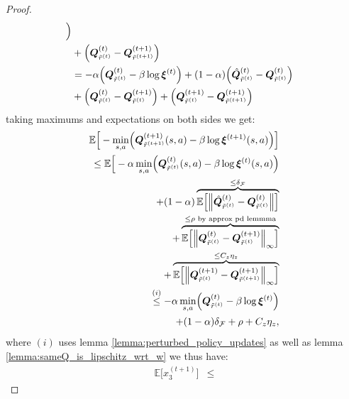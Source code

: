 \begin{proof}
\begin{align*}
    \Bigr) \\ & 
    + \Bigl(
        \bm{Q}^{(t)}_{\tilde{r}^{(t)}}   
        - \bm{Q}_{\tilde{r}^{(t+1)}}^{(t+1)}
    \Bigr)
    \\ 
    &= 
    - \alpha \Bigl(\bm{Q}^{(t)}_{\tilde{r}^{(t)}} - \beta \log \bm{\xi}^{(t)}  \Bigr)
    + (1-\alpha) \Bigl( 
        \hat{\bm{Q}}_{\tilde{r}^{(t)}}^{(t)} 
        - \bm{Q}^{(t)}_{\tilde{r}^{(t)}} 
    \Bigr) \\ & 
    + \Bigl(
        \bm{Q}^{(t)}_{\tilde{r}^{(t)}}   
        - \bm{Q}_{\tilde{r}^{(t)}}^{(t+1)}
        \Bigr)
    + \Bigl(
        \bm{Q}_{\tilde{r}^{(t)}}^{(t+1)}
        - \bm{Q}_{\tilde{r}^{(t+1)}}^{(t+1)}
    \Bigr)
    \\ 
\end{align*}
taking maximums and expectations on both sides we get:
\begin{align*}
    \mathbb{E}\Big[ - \min_{s,a} \Bigl( \bm{Q}_{\tilde{r}^{(t+1)}}^{(t+1)}(s,a)  - \beta \log \bm{\xi}^{(t+1)} (s,a) \Bigr) \Big] \\
    \leq 
    \mathbb{E}\Big[
    - \alpha \min_{s,a} \Bigl(\bm{Q}^{(t)}_{\tilde{r}^{(t)}} (s,a) - \beta \log \bm{\xi}^{(t)}  (s,a) \Bigr) \\ 
    +
    (1-\alpha)   \overbrace{\mathbb{E}\Big[ \Big\|
        \hat{\bm{Q}}_{\tilde{r}^{(t)}}^{(t)}- 
        \bm{Q}^{(t)}_{\tilde{r}^{(t)}}  \Big\| \Big] }^{\leq \delta_\mathcal{F}} \\ 
    + 
     \overbrace{\mathbb{E}\Big[ \Big\| 
        \bm{Q}^{(t)}_{\tilde{r}^{(t)}}   
        -\bm{Q}_{\tilde{r}^{(t)}}^{(t+1)}
        \Big\|_\infty \Big] }^{\leq \rho \text{ by approx pd lemmma}} \\ 
    + \overbrace{ \mathbb{E}\Big[ \Big\|
        \bm{Q}_{\tilde{r}^{(t)}}^{(t+1)}
        - \bm{Q}_{\tilde{r}^{(t+1)}}^{(t+1)}
        \Big\|_\infty \Big] }^{\leq C_z \eta_z}
    \\ 
    \stackrel{(i)}{\leq}
    - \alpha \min_{s,a} \Bigl(\bm{Q}^{(t)}_{\tilde{r}^{(t)}} - \beta \log \bm{\xi}^{(t)}  \Bigr)\\ 
    + (1-\alpha) \delta_\mathcal{F} + \rho + C_z \eta_z, \\
\end{align*}
where $(i)$ uses lemma \ref{lemma:perturbed_policy_updates} as well as lemma \ref{lemma:sameQ_is_lipschitz_wrt_w} we thus have:
\begin{equation}
    \label{eq:ineq_min}
    \begin{aligned}
        \mathbb{E}\big[x_3^{(t+1)} \big]&\leq

\end{aligned}
\end{equation}
\end{proof}
